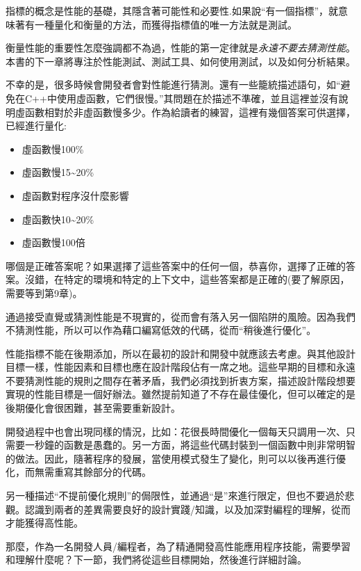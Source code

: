 指標的概念是性能的基礎，其隱含著可能性和必要性.如果說“有一個指標”，就意味著有一種量化和衡量的方法，而獲得指標值的唯一方法就是測試。

衡量性能的重要性怎麼強調都不為過，性能的第一定律就是\textit{永遠不要去猜測性能}。本書的下一章將專注於性能測試、測試工具、如何使用測試，以及如何分析結果。

不幸的是，很多時候會開發者會對性能進行猜測。還有一些籠統描述語句，如“避免在C++中使用虛函數，它們很慢。”其問題在於描述不準確，並且這裡並沒有說明虛函數相對於非虛函數慢多少。作為給讀者的練習，這裡有幾個答案可供選擇，已經進行量化:

\begin{itemize}
\item 虛函數慢100\%
\item 虛函數慢15\textasciitilde20\%
\item 虛函數對程序沒什麼影響
\item 虛函數快10\textasciitilde20\%
\item 虛函數慢100倍
\end{itemize}

哪個是正確答案呢？如果選擇了這些答案中的任何一個，恭喜你，選擇了正確的答案。沒錯，在特定的環境和特定的上下文中，這些答案都是正確的(要了解原因，需要等到第9章)。

通過接受直覺或猜測性能是不現實的，從而會有落入另一個陷阱的風險。因為我們不猜測性能，所以可以作為藉口編寫低效的代碼，從而“稍後進行優化”。

性能指標不能在後期添加，所以在最初的設計和開發中就應該去考慮。與其他設計目標一樣，性能因素和目標也應在設計階段佔有一席之地。這些早期的目標和永遠不要猜測性能的規則之間存在著矛盾，我們必須找到折衷方案，描述設計階段想要實現的性能目標是一個好辦法。雖然提前知道了不存在最佳優化，但可以確定的是後期優化會很困難，甚至需要重新設計。

開發過程中也會出現同樣的情況，比如：花很長時間優化一個每天只調用一次、只需要一秒鐘的函數是愚蠢的。另一方面，將這些代碼封裝到一個函數中則非常明智的做法。因此，隨著程序的發展，當使用模式發生了變化，則可以以後再進行優化，而無需重寫其餘部分的代碼。

另一種描述“不提前優化規則”的侷限性，並通過“是”來進行限定，但也不要過於悲觀。認識到兩者的差異需要良好的設計實踐/知識，以及加深對編程的理解，從而才能獲得高性能。

那麼，作為一名開發人員/編程者，為了精通開發高性能應用程序技能，需要學習和理解什麼呢？下一節，我們將從這些目標開始，然後進行詳細討論。
















